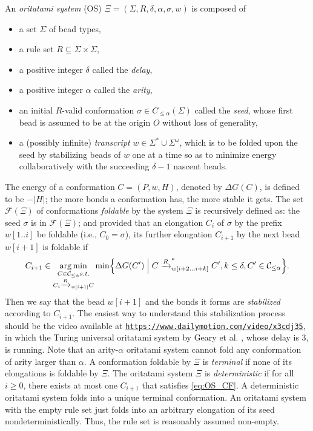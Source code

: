 \documentclass[runningheads]{llncs}
\DeclareMathOperator*{\argmin}{arg\,min}
\begin{document}
An \textit{oritatami system} (OS) $\Xi = (\Sigma, R, \delta, \alpha, \sigma, w)$ is composed of
\begin{itemize}
\item a set $\Sigma$ of bead types, 
\item a rule set $R \subseteq \Sigma \times \Sigma$, 
\item a positive integer $\delta$ called the \textit{delay}, 
\item a positive integer $\alpha$ called the \textit{arity}, 
\item an initial $R$-valid conformation $\sigma \in C_{\le \alpha}(\Sigma)$ called the \textit{seed}, whose first bead is assumed to be at the origin $O$ without loss of generality, 
\item a (possibly infinite) \textit{transcript} $w \in \Sigma^* \cup \Sigma^\omega$, which is to be folded upon the seed by stabilizing beads of $w$ one at a time so as to minimize energy collaboratively with the succeeding $\delta{-}1$ nascent beads. 
\end{itemize}
The energy of a conformation $C = (P, w, H)$, denoted by $\Delta G(C)$, is defined to be ${-}|H|$; the more bonds a conformation has, the more stable it gets. 
The set $\mathcal{F}(\Xi)$ of conformations \textit{foldable} by the system $\Xi$ is recursively defined as: the seed $\sigma$ is in $\mathcal{F}(\Xi)$; and provided that an elongation $C_i$ of $\sigma$ by the prefix $w[1..i]$ be foldable (i.e., $C_0 = \sigma$), its further elongation $C_{i+1}$ by the next bead $w[i+1]$ is foldable if 
\begin{equation}\label{eq:OS_CF}
C_{i+1} \in \argmin_{
\substack{
C \in \mathcal{C}_{\le \alpha} s.t. \\
C_i \xrightarrow{R}_{w[i+1]}C \\
}
}
\min \Bigl\{ \Delta G(C') \Bigm|
C \xrightarrow{R}^*_{w[i+2...i+k]}C', k\le \delta, C' \in \mathcal{C}_{\le \alpha}
\Bigr\}.
\end{equation}
%
Then we say that the bead $w[i+1]$ and the bonds it forms are \textit{stabilized} according to $C_{i+1}$. 
The easiest way to understand this stabilization process should be the video available at \href{https://www.dailymotion.com/video/x3cdj35}{\tt https://www.dailymotion.com/video/x3cdj35}, in which the Turing universal oritatami system by Geary et al. \cite{GeMeScSe2018}, whose delay is 3, is running. 
Note that an arity-$\alpha$ oritatami system cannot fold any conformation of arity larger than $\alpha$. 
A conformation foldable by $\Xi$ is \textit{terminal} if none of its elongations is foldable by $\Xi$. 
The oritatami system $\Xi$ is \textit{deterministic} if for all $i \ge 0$, there exists at most one $C_{i+1}$ that satisfies \eqref{eq:OS_CF}. 
A deterministic oritatami system folds into a unique terminal conformation. 
An oritatami system with the empty rule set just folds into an arbitrary elongation of its seed nondeterministically. 
Thus, the rule set is reasonably assumed non-empty. 
\end{document}

